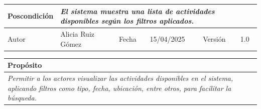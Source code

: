 \begin{table}[H]
\begin{tabular}{llllllll}
    \multicolumn{1}{|l|}{Poscondición}                           & \multicolumn{7}{p{10cm}|}{{\color[HTML]{808080} \textit{El sistema muestra una lista de actividades disponibles según los filtros aplicados.}}}                                                                                                                                                                                                                                                       \\ \hline
    \multicolumn{1}{|l|}{Autor}                                  & \multicolumn{1}{l|}{{\color[HTML]{808080} \textit{}Alicia Ruiz Gómez}}                           & \multicolumn{2}{l|}{Fecha}                                                   & \multicolumn{1}{l|}{{\color[HTML]{808080} \textit{}15/04/2025}}                         & \multicolumn{2}{l|}{Versión}                                                      & \multicolumn{1}{l|}{1.0}                                                     \\ \hline
    \end{tabular}
\end{table}

\begin{table}[H]
    \begin{tabular}{llllllll}
    \hline
    \multicolumn{8}{|l|}{\cellcolor[HTML]{F2F2F2}Propósito}                                                                                                                                                                                                                                                                                                                                                                                           \\ \hline
    \multicolumn{8}{|p{15cm}|}{{\color[HTML]{808080} \textit{Permitir a los actores visualizar las actividades disponibles en el sistema, aplicando filtros como tipo, fecha, ubicación, entre otros, para facilitar la búsqueda.}}}                                                                                                                                                                                                             \\ \hline
    \end{tabular}
\end{table}

